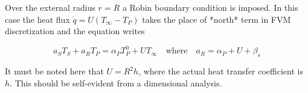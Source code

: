 \documentclass[oneside]{textbook}
\begin{document}
Over the external radius $r=R$ a Robin boundary condition is imposed. In this case the heat flux $\dot{q}=U(T_\infty-T_P)$ takes the place of *north* term in FVM discretization and the equation writes

\begin{equation}
a_ST_S + a_RT_P = \alpha_{P}T_P^{0}+UT_\infty\quad\text{where}\quad{}a_R=\alpha_{P}+U+\beta_{s}
\end{equation}

It must be noted here that $U=R^2h$, where the actual heat transfer coefficient is $h$. This should be self-evident from a dimensional analysis.


\printbibliography%

\appendix%

%


\printunsrtglossary[%
    type  = symbols,%
    style = long,%
]%
\end{document}
